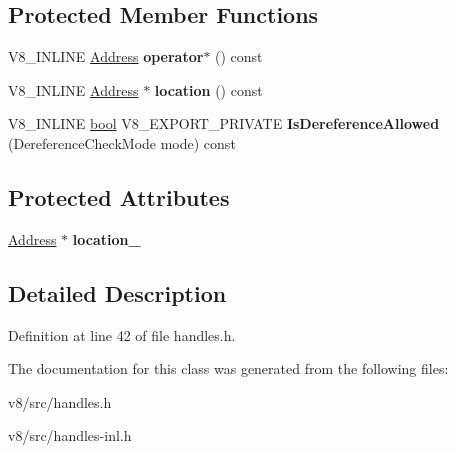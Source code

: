 \subsection*{Protected Member Functions}
\begin{DoxyCompactItemize}
\item 
\mbox{\label{classv8_1_1internal_1_1HandleBase_a83fc51e84d42f98b74ae0b0dba7efce9}} 
V8\+\_\+\+I\+N\+L\+I\+NE \mbox{\hyperlink{classuintptr__t}{Address}} {\bfseries operator$\ast$} () const
\item 
\mbox{\label{classv8_1_1internal_1_1HandleBase_a756d12b91b5963a7627e95883cd18d2e}} 
V8\+\_\+\+I\+N\+L\+I\+NE \mbox{\hyperlink{classuintptr__t}{Address}} $\ast$ {\bfseries location} () const
\item 
\mbox{\label{classv8_1_1internal_1_1HandleBase_a999895c78d7deda166bcb60cbba70ccf}} 
V8\+\_\+\+I\+N\+L\+I\+NE \mbox{\hyperlink{classbool}{bool}} V8\+\_\+\+E\+X\+P\+O\+R\+T\+\_\+\+P\+R\+I\+V\+A\+TE {\bfseries Is\+Dereference\+Allowed} (Dereference\+Check\+Mode mode) const
\end{DoxyCompactItemize}
\subsection*{Protected Attributes}
\begin{DoxyCompactItemize}
\item 
\mbox{\label{classv8_1_1internal_1_1HandleBase_ad89a15681c5f6f8c297018053ea7d8a7}} 
\mbox{\hyperlink{classuintptr__t}{Address}} $\ast$ {\bfseries location\+\_\+}
\end{DoxyCompactItemize}


\subsection{Detailed Description}


Definition at line 42 of file handles.\+h.



The documentation for this class was generated from the following files\+:\begin{DoxyCompactItemize}
\item 
v8/src/handles.\+h\item 
v8/src/handles-\/inl.\+h\end{DoxyCompactItemize}
